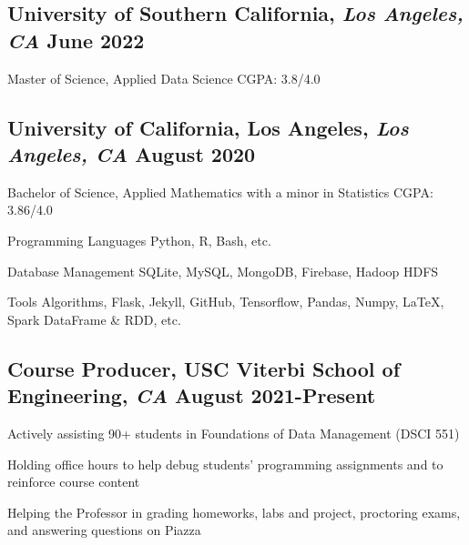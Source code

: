 \documentclass[11pt]{article}
\begin{document}
\subsection*{University of Southern California{\normalfont, \textit{Los Angeles, CA} \hfill June 2022}}
\noindent
Master of Science, Applied Data Science
\hfill
CGPA: 3.8/4.0

\vspace{0.1in}

\subsection*{University of California, Los Angeles{\normalfont, \textit{Los Angeles, CA} \hfill August 2020}}
\noindent
Bachelor of Science, Applied Mathematics with a minor in Statistics 
\hfill 
CGPA: 3.86/4.0

\vspace{0.1in}

\begin{compactdesc}
    \item[Programming Languages] Python, R, Bash, etc.
    \item[Database Management] SQLite, MySQL, MongoDB, Firebase, Hadoop HDFS
    \item[Tools] Algorithms, Flask, Jekyll, GitHub, Tensorflow, Pandas, Numpy, \LaTeX, Spark DataFrame \& RDD, etc.
\end{compactdesc}
\vspace{0.1in}

\subsection*{Course Producer{\normalfont, USC Viterbi School of Engineering, 
\textit{CA} \hfill 
August 2021-Present}}
\begin{compactitem}
	\item Actively assisting 90+ students in Foundations of Data Management 
	(DSCI 551)
	\item Holding office hours to help debug students’ programming assignments 
	and to reinforce 
	course content 
	\item Helping the Professor in grading homeworks, labs and project, 
	proctoring exams, and 
	answering questions on Piazza
\end{compactitem}
\vspace{0.1in}
\end{document}
